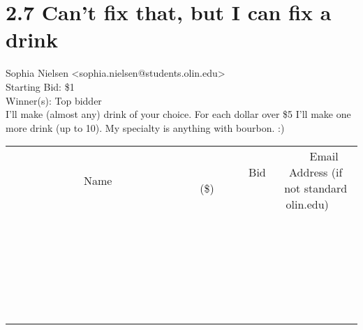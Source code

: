 \documentclass[11pt]{article}
\begin{document}
					\section*{2.7 Can’t fix that, but I can fix a drink}
					Sophia Nielsen <sophia.nielsen@students.olin.edu> \\
					Starting Bid: \$1 \\
					Winner(s): Top bidder \\
					I’ll make (almost any) drink of your choice. For each dollar over \$5 I’ll make one more drink (up to 10). My specialty is anything with bourbon. :) \\
					[6ex]
					\begin{tabular}{c c c}
						~~~~~~~~~~~~~Name~~~~~~~~~~~~~ & ~~~~~~~~~Bid (\$)~~~~~~~~~ & ~~~Email Address (if not standard olin.edu)~~~ \\
				
 & & \\
\hline
 & & \\
\hline
 & & \\
\hline
 & & \\
\hline
 & & \\
\hline
 & & \\
\hline
 & & \\
\hline
 & & \\
\hline
 & & \\
\hline
 & & \\
\hline
 & & \\
\hline
 & & \\
\hline
 & & \\
\hline
 & & \\
\hline
 & & \\
\hline
 & & \\
\hline
 & & \\
\hline
 & & \\
\hline
 & & \\
\hline
 & & \\
\hline
 & & \\
\hline
 & & \\
\hline
 & & \\
\hline
 & & \\
\hline
 & & \\
\hline
 & & \\
\hline
					\end{tabular}
					\clearpage
				
\end{document}
